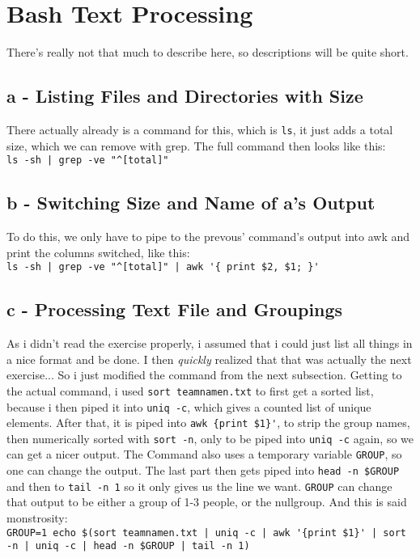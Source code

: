 \documentclass[a4paper, 11pt]{article}
\begin{document}
    \section{Bash Text Processing}
    There's really not that much to describe here, so descriptions will be quite short.
    
    \subsection{a - Listing Files and Directories with Size}
    There actually already is a command for this, which is \texttt{ls}, it just adds a total size, which we can 
    remove with grep. The full command then looks like this:\\ 
    \lstinline{ls -sh | grep -ve "^[total]"}

    \subsection{b - Switching Size and Name of a's Output}
    To do this, we only have to pipe to the prevous' command's output into awk and print the columns switched, 
    like this:\\
    \lstinline+ls -sh | grep -ve "^[total]" | awk '{ print $2, $1; }'+

    \subsection{c - Processing Text File and Groupings}
    As i didn't read the exercise properly, i assumed that i could just list all things in a nice format and be done.
    I then \textit{quickly} realized that that was actually the next exercise... So i just modified the command from the next subsection.
    Getting to the actual command, i used \lstinline{sort teamnamen.txt} to first get a sorted list, because i then piped it 
    into \lstinline{uniq -c}, which gives a counted list of unique elements. After that, it is piped into \lstinline+awk {print $1}'+, 
    to strip the group names, then numerically sorted with \lstinline{sort -n}, only to be piped into \lstinline{uniq -c} again, so we can get a nicer output.
    The Command also uses a temporary variable \lstinline{GROUP}, so one can change the output. The last part then gets piped into 
    \lstinline{head -n $GROUP} and then to \lstinline{tail -n 1} so it only gives us the line we want. \texttt{GROUP} can change that output to be either a group 
    of 1-3 people, or the nullgroup. And this is said monstrosity:\\
    \lstinline+GROUP=1 echo $(sort teamnamen.txt | uniq -c | awk '{print $1}' | sort -n | uniq -c | head -n $GROUP | tail -n 1)+ 
\end{document}
